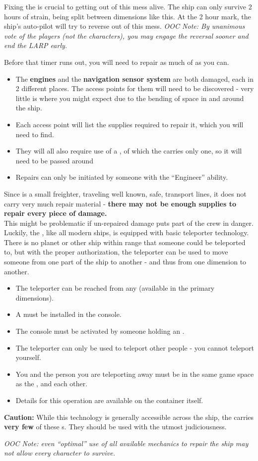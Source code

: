 \documentclass[green]{TMFHope}
\begin{document}
\name{\gFixTheShip{}}

Fixing the \pNew{} is crucial to getting out of this mess alive. The ship can only survive 2 hours of strain, being split between dimensions like this. At the 2 hour mark, the ship's auto-pilot will try to reverse out of this mess. \emph{OOC Note: By unanimous vote of the players (not the characters), you may engage the reversal sooner and end the LARP early.}

Before that timer runs out, you will need to repair as much of \pNew{} as you can. 
\begin{itemize}
  \item The \textbf{engines} and the \textbf{navigation sensor system} are both damaged, each in 2 different places. The access points for them will need to be discovered - very little is where you might expect due to the bending of space in and around the ship. 
  \item Each access point will list the supplies required to repair it, which you will need to find. 
	\item They will all also require use of a \textbf{\iTorch{\MYname{}}}, of which the \pNew{} carries only one, so it will need to be passed around
	\item Repairs can only be initiated by someone with the ``Engineer'' ability.
\end{itemize}
Since \pNew{} is a small freighter, traveling well known, safe, transport lines, it does not carry very much repair material - \textbf{there may not be enough supplies to repair every piece of damage.}\\

This might be problematic if un-repaired damage puts part of the crew in danger. Luckily, the \pNew{}, like all modern ships, is equipped with basic teleporter technology. There is no planet or other ship within range that someone could be teleported to, but with the proper authorization, the teleporter can be used to move someone from one part of the ship to another - and thus from one dimension to another.

\begin{itemize}
  \item The teleporter can be reached from any \sConsole{} (available in the primary dimensions).
  \item A \iCrystal{\MYname{}} must be installed in the console.
	\item The console must be activated by someone holding an \iKey{\MYname{}}.
	\item The teleporter can only be used to teleport other people - you cannot teleport yourself.
	\item You and the person you are teleporting away must be in the same game space as the \sConsole{}, and each other.
	\item Details for this operation are available on the \sConsole{} container itself.
\end{itemize}
\textbf{Caution:} While this technology is generally accessible across the ship, the \pNew{} carries \textbf{very few} of these \iCrystal{\MYname{}}s. They should be used with the utmost judiciousness. 

\emph{OOC Note: even ``optimal'' use of all available mechanics to repair the ship may not allow every character to survive.}
\end{document}
